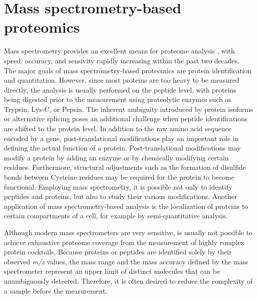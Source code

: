 

\section{Mass spectrometry-based proteomics}

Mass spectrometry provides an excellent means for proteome analysis
\citep{Aebersold2003}, with speed, accuracy, and sensivity rapidly increasing
within the past two decades.
The major goals of mass spectrometry-based proteomics are protein 
identification and quantitation.
However, since most proteins are too heavy to be measured directly, the
analysis is usually performed on the peptide level, with proteins being digested
prior to the measurement using proteolytic enzymes such as Trypsin, Lys-C, or 
Pepsin. 
The inherent ambiguity introduced by protein isoforms or alternative splicing
poses an additional challenge when peptide identifications are shifted to
the protein level.
In addition to the raw amino acid sequence encoded by a gene, post-translational
modifications play an important role in defining the actual function of a
protein.
Post-translational modifications may modify a protein by adding an enzyme or by
chemically modifying certain residues.
Furthermore, structural adjustments such as the formation of disulfide 
bonds between Cysteine residues may be required for the protein to become 
functional.
Employing mass spectrometry, it is possible not only to identify peptides and
proteins, but also to study their various modifications.
Another application of mass spectrometry-based analysis is the localization of
proteins to certain compartments of a cell, for example by semi-quantitative
analysis.


Although modern mass spectrometers are very sensitive, is usually not possible
to achieve exhaustive proteome coverage from the measurement of highly complex 
protein cocktails.
Because proteins or peptides are identified solely by their observed {\em m/z} 
values, the mass range and the mass accuracy defined by the mass spectrometer
represent an upper limit of distinct molecules that can be unambiguously 
detected.
Therefore, it is often desired to reduce the complexity of a sample before
the measurement.


